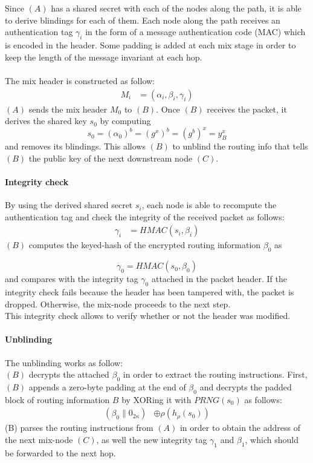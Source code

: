     \\~\\Since $(A)$ has a shared secret with each of the nodes along the path, it is able to derive blindings for each of them.
    \newline Each node along the path receives an authentication tag $\gamma_i$ in the form of a message authentication code (MAC)
which is encoded in the header.
\newline Some padding is added at each mix stage in order to keep the length of the message invariant at each hop.
\\~\\The mix header is constructed as follow: 
\begin{align}  
    M_i&=(\alpha_i,\beta_i,\gamma_i)
\end{align}
\newline $(A)$ sends the mix header $M_0$ to $(B)$. Once $(B)$ receives the packet, it derives the shared key $s_0$ by computing $$s_0=(\alpha_0)^b=(g^x)^b=(g^b)^x=y^x_B$$
and removes its blindings. This allows $(B)$ to unblind the routing info that tells $(B)$ the public key of the next downstream node $(C)$.
\paragraph{Integrity check}
By using the derived shared secret $s_i$, each node is able to recompute the authentication tag and check the integrity of the received packet as follows: 
\begin{align}  
    \gamma_i&=HMAC(s_i,\beta_i)
    \label{eq:6}
\end{align}
$(B)$ computes the keyed-hash of the encrypted routing information $\beta_0$ as

    $$\gamma_0=HMAC(s_0,\beta_0)$$
and compares with the integrity tag $\gamma_0$ attached in the packet header. If the integrity check fails because the header has been tampered with, the packet is dropped. Otherwise, the mix-node proceeds to the next step.
\\This integrity check allows to verify whether or not the header was modified.

\paragraph{Unblinding}
The unblinding works as follow:
\\$(B)$ decrypts the attached $\beta_0$ in order to extract the routing instructions. First, $(B)$ appends a zero-byte padding at the end of $\beta_0$ and decrypts the padded block of routing information $B$ by XORing it with $PRNG(s_{0})$ as follows:
\begin{align}
    (\beta_0\|0_{2\kappa})&\oplus \rho(h_{\rho}(s_{0}))
\end{align}
(B) parses the routing instructions from $(A)$ in order to obtain the address of the next mix-node $(C)$, as well the new integrity tag $\gamma_1$ and $\beta_1$, which should be forwarded to the next hop.
